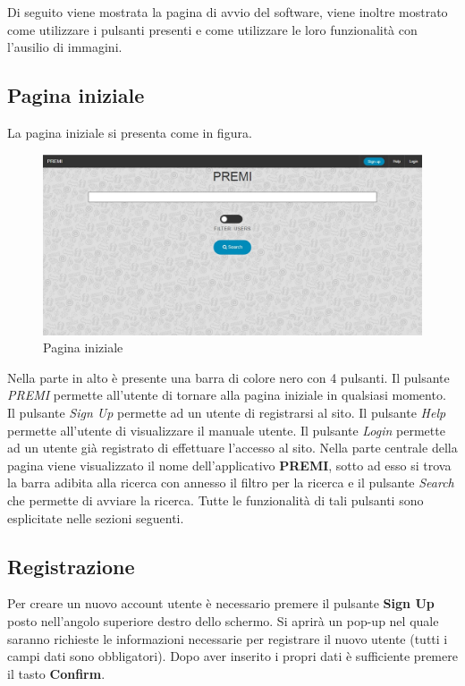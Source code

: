 Di seguito viene mostrata la pagina di avvio del software, viene inoltre mostrato come utilizzare i pulsanti presenti e come utilizzare le loro funzionalità con l'ausilio di immagini.

\subsection{Pagina iniziale}
La pagina iniziale si presenta come in figura.

\begin{figure}[H] 
	\centering 
	\includegraphics[scale=0.40] {img/pagina_iniziale}
	\caption{Pagina iniziale} 
\end{figure}

\noindent Nella parte in alto è presente una barra di colore nero con 4 pulsanti. Il pulsante \textit{PREMI} permette all'utente di tornare alla pagina iniziale in qualsiasi momento. Il pulsante \textit{Sign Up} permette ad un utente di registrarsi al sito. Il pulsante \textit{Help} permette all'utente di visualizzare il manuale utente. Il pulsante \textit{Login} permette ad un utente già registrato di effettuare l'accesso al sito.
Nella parte centrale della pagina viene visualizzato il nome dell'applicativo \textbf{PREMI}, sotto ad esso si trova la barra adibita alla ricerca con annesso il filtro per la ricerca e il pulsante \textit{Search} che permette di avviare la ricerca. Tutte le funzionalità di tali pulsanti sono esplicitate nelle sezioni seguenti.

\subsection{Registrazione}
Per creare un nuovo account utente è necessario premere il pulsante \textbf{Sign Up} posto nell'angolo superiore destro dello schermo. Si aprirà un pop-up nel quale saranno richieste le informazioni necessarie per registrare il nuovo utente (tutti i campi dati sono obbligatori). Dopo aver inserito i propri dati è sufficiente premere il tasto \textbf{Confirm}.

